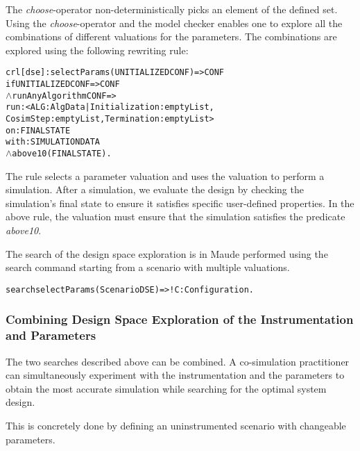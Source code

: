 The \emph{choose}-operator non-deterministically picks an element of the defined set.
Using the \emph{choose}-operator and the model checker enables one to explore all the combinations of different valuations for the parameters.
The combinations are explored using the following rewriting rule:

\begin{alltt}
  \small
  crl [dse] : selectParams(UNITIALIZEDCONF) => CONF 
  if UNITIALIZEDCONF => CONF
  \(\land\) runAnyAlgorithm CONF => 
      run: < ALG : AlgData | Initialization : emptyList, 
      CosimStep : emptyList, Termination : emptyList > 
      on: FINALSTATE
      with: SIMULATIONDATA
  \(\land\) above10(FINALSTATE) .
\end{alltt}

The rule selects a parameter valuation and uses the valuation to perform a simulation.
After a simulation, we evaluate the design by checking the simulation's final state to ensure it satisfies specific user-defined properties.
In the above rule, the valuation must ensure that the simulation satisfies the predicate \emph{above10}.

The search of the design space exploration is in Maude performed using the search command starting from a scenario with multiple valuations.
\begin{alltt}
  \small
  search selectParams(ScenarioDSE)  =>! C:Configuration .
\end{alltt}

\subsubsection{Combining Design Space Exploration of the Instrumentation and Parameters}
The two searches described above can be combined. A co-simulation practitioner can simultaneously experiment with the instrumentation and the parameters to obtain the most accurate simulation while searching for the optimal system design.

This is concretely done by defining an uninstrumented scenario with changeable parameters.

